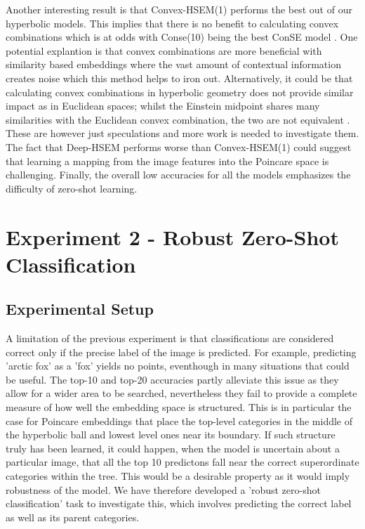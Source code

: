 \documentclass[12pt]{report}
\begin{document}
Another interesting result is that Convex-HSEM(1) performs the best out of our hyperbolic models. This implies that there is no benefit to calculating convex combinations which is at odds with Conse(10) being the best ConSE model \cite{Norouzi2013}. One potential explantion is that convex combinations are more beneficial with similarity based embeddings where the vast amount of contextual information creates noise which this method helps to iron out. Alternatively, it could be that calculating convex combinations in hyperbolic geometry does not provide similar impact as in Euclidean spaces; whilst the Einstein midpoint shares many similarities with the Euclidean convex combination, the two are not equivalent \cite{Ungar2009}. These are however just speculations and more work is needed to investigate them. The fact that Deep-HSEM performs worse than Convex-HSEM(1) could suggest that learning a mapping from the image features into the Poincare space is challenging. Finally, the overall low accuracies for all the models emphasizes the difficulty of zero-shot learning.

\section{Experiment 2 - Robust Zero-Shot \\ Classification}
\subsection{Experimental Setup}
A limitation of the previous experiment is that classifications are considered correct only if the precise label of the image is predicted. For example, predicting 'arctic fox' as a 'fox' yields no points, eventhough in many situations that could be useful. The top-10 and top-20 accuracies partly alleviate this issue as they allow for a wider area to be searched, nevertheless they fail to provide a complete measure of how well the embedding space is structured. This is in particular the case for Poincare embeddings that place the top-level categories in the middle of the hyperbolic ball and lowest level ones near its boundary. If such structure truly has been learned, it could happen, when the model is uncertain about a particular image, that all the top 10 predictons fall near the correct superordinate categories within the tree. This would be a desirable property as it would imply robustness of the model. We have therefore developed a 'robust zero-shot classification' task to investigate this, which involves predicting the correct label as well as its parent categories.
\end{document}
